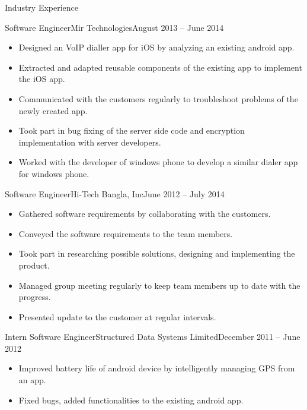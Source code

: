 \documentclass[]{mcdowellcv}
\begin{document}
	\begin{cvsection}{Industry Experience}
		
		\begin{cvsubsection}{Software Engineer}{Mir Technologies}{August 2013 -- June 2014}

			\begin{itemize}
				\item Designed an VoIP dialler app for iOS by analyzing an existing android app.
				\item Extracted and adapted reusable components of the existing app to implement the iOS app.
				\item Communicated with the customers regularly to troubleshoot problems of the newly created app.
				\item Took part in bug fixing of the server side code and encryption implementation with server developers.
				\item Worked with the developer of windows phone to develop a similar dialer app for windows phone.
			\end{itemize}
\end{cvsubsection}		
		\begin{cvsubsection}{Software Engineer}{Hi-Tech Bangla, Inc}{June 2012 -- July 2014}	
			\begin{itemize}
				\item Gathered software requirements by collaborating with the customers.
				\item Conveyed the software requirements to the team members.
				\item Took part in researching possible solutions, designing and implementing the product.
				\item Managed  group meeting regularly to keep  team members up to date with the progress.
				\item Presented  update to the customer at regular intervals.
			\end{itemize}
			
		\end{cvsubsection}

		\begin{cvsubsection}{Intern Software Engineer}{Structured Data Systems Limited}{December 2011 -- June 2012}	
			\begin{itemize}
				\item Improved battery life of android device by intelligently managing GPS from an app.
				\item Fixed bugs, added functionalities to the existing android app.
			\end{itemize}	
		\end{cvsubsection}
	\end{cvsection}
	
\end{document}
